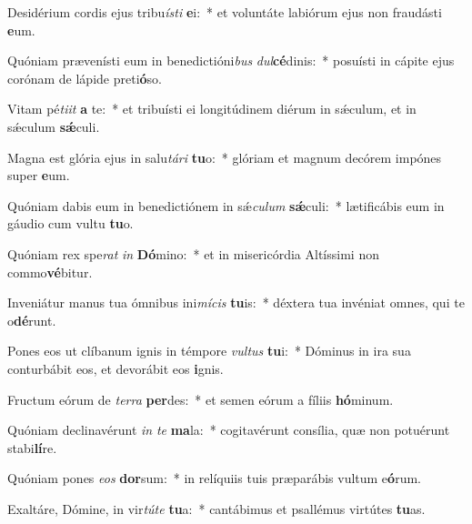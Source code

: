 \item Desidérium cordis ejus tribu\textit{ís}\textit{ti} \textbf{e}i:~* et voluntáte labiórum ejus non fraudásti \textbf{e}um.
\item Quóniam prævenísti eum in benedictióni\textit{bus} \textit{dul}\textbf{cé}dinis:~* posuísti in cápite ejus corónam de lápide preti\textbf{ó}so.
\item Vitam pé\textit{ti}\textit{it} \textbf{a} te:~* et tribuísti ei longitúdinem diérum in sǽculum, et in sǽculum \textbf{sǽ}culi.
\item Magna est glória ejus in salu\textit{tá}\textit{ri} \textbf{tu}o:~* glóriam et magnum decórem impónes super \textbf{e}um.
\item Quóniam dabis eum in benedictiónem in sǽ\textit{cu}\textit{lum} \textbf{sǽ}culi:~* lætificábis eum in gáudio cum vultu \textbf{tu}o.
\item Quóniam rex spe\textit{rat} \textit{in} \textbf{Dó}mino:~* et in misericórdia Altíssimi non commo\textbf{vé}bitur.
\item Inveniátur manus tua ómnibus ini\textit{mí}\textit{cis} \textbf{tu}is:~* déxtera tua invéniat omnes, qui te o\textbf{dé}runt.
\item Pones eos ut clíbanum ignis in témpore \textit{vul}\textit{tus} \textbf{tu}i:~* Dóminus in ira sua conturbábit eos, et devorábit eos \textbf{i}gnis.
\item Fructum eórum de \textit{ter}\textit{ra} \textbf{per}des:~* et semen eórum a fíliis \textbf{hó}minum.
\item Quóniam declinavérunt \textit{in} \textit{te} \textbf{ma}la:~* cogitavérunt consília, quæ non potuérunt stabi\textbf{lí}re.
\item Quóniam pones \textit{e}\textit{os} \textbf{dor}sum:~* in relíquiis tuis præparábis vultum e\textbf{ó}rum.
\item Exaltáre, Dómine, in vir\textit{tú}\textit{te} \textbf{tu}a:~* cantábimus et psallémus virtútes \textbf{tu}as.

